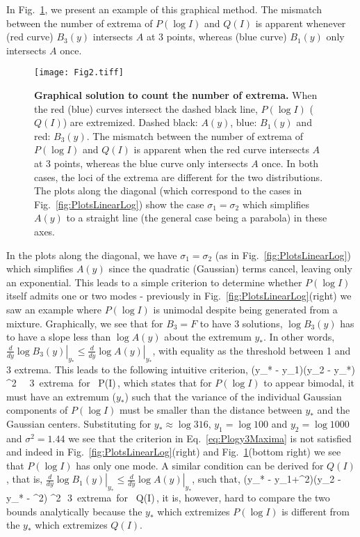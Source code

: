 \documentclass[11pt,a4paper,draft]{article}
\begin{document}
In Fig.~\ref{fig:ExtremaSolutions}, we present an example of this graphical method. The mismatch between the number of extrema of $P(\log I)$ and $Q(I)$ is apparent whenever (red curve) $B_3(y)$ intersects $A$ at 3 points, whereas (blue curve) $B_1(y)$ only intersects $A$ once. \smallskip

\begin{figure}[!ht]
 \centering
  \texttt{[image: Fig2.tiff]}
  \caption{\textbf{Graphical solution to count the number of extrema.} When the red (blue) curves intersect the dashed black line, $P(\log I)$ ($Q(I)$) are extremized. Dashed black: $A(y)$, blue: $B_1(y)$ and red: $B_3(y)$. The mismatch between the number of extrema of $P(\log I)$ and $Q(I)$ is apparent when the red curve intersects $A$ at 3 points, whereas the blue curve only intersects $A$ once. In both cases, the loci of the extrema are different for the two distributions. The plots along the diagonal (which correspond to the cases in Fig.~\ref{fig:PlotsLinearLog}) show the case $\sigma_1=\sigma_2$ which simplifies $A(y)$ to a straight line (the general case being a parabola) in these axes.}
  \label{fig:ExtremaSolutions}
\end{figure}

In the plots along the diagonal, we have $\sigma_1=\sigma_2$ (as in Fig.~\ref{fig:PlotsLinearLog})  which simplifies $A(y)$ since the quadratic (Gaussian) terms cancel, leaving only an exponential. This leads to a simple criterion to determine whether $P(\log I)$ itself admits one or two modes - previously in Fig.~\ref{fig:PlotsLinearLog}(right) we saw an example where $P(\log I)$ is unimodal despite being generated from a mixture. Graphically, we see that for $B_3=F$ to have 3 solutions, $\log B_3(y)$ has to have a slope less than $\log A(y)$ about the extremum $y_*$. In other words, $\left.\frac{d}{dy} \log B_3(y)\right\vert_{y_*} \le \left.\frac{d}{dy} \log A(y)\right\vert_{y_*}$, with equality as the threshold between 1 and 3 extrema. This leads to the following intuitive criterion,
\be 
\label{eq:Plogy3Maxima}
(y_* - y_1)(y_2 - y_*) \ge \sigma ^2 \,\,\Longrightarrow \,\, \mbox{3 extrema for } P(\log I)\,,
\ee
which states that for $P(\log I)$ to appear bimodal, it must have an extremum ($y_*$) such that the variance of the individual Gaussian components of $P(\log I)$ must be smaller than the distance between $y_*$ and the Gaussian centers. Substituting for $y_* \approx \log 316$, $y_1 = \log 100$ and $y_2=\log 1000$ and $\sigma^2 = 1.44$ we see that the criterion in Eq.~\ref{eq:Plogy3Maxima} is not satisfied and indeed in Fig.~\ref{fig:PlotsLinearLog}(right) and Fig.~\ref{fig:ExtremaSolutions}(bottom right) we see that $P(\log I)$ has only one mode. A similar condition can be derived for $Q(I)$, that is, $\left.\frac{d}{dy} \log B_1(y)\right\vert_{y_*} \le \left.\frac{d}{dy} \log A(y)\right\vert_{y_*}$, such that,
\be 
\label{eq:QI3Maxima}
(y_* - y_1+\sigma^2)(y_2 - y_* - \sigma^2) \ge \sigma ^2\,\,\Longrightarrow \,\,\mbox{3 extrema for } Q(I)\,,
\ee \smallskip
it is, however, hard to compare the two bounds analytically because the $y_*$ which extremizes $P(\log I)$ is different from the $y_*$ which extremizes $Q(I)$.
\end{document}

